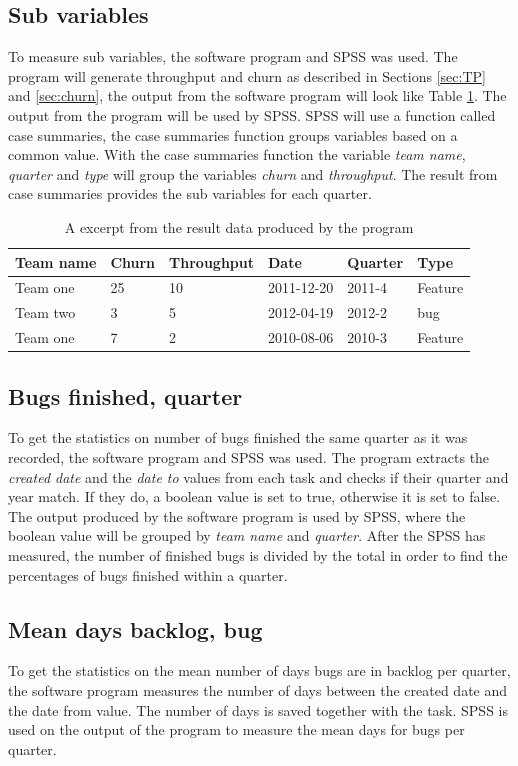 \documentclass[UKenglish]{ifimaster}  %
\begin{document}
\subsection {Sub variables}
\label{sec:bug}
To measure sub variables, the software program and SPSS was used. The program will generate throughput and churn as described in Sections \ref{sec:TP} and \ref{sec:churn}, the output from the software program will look like Table \ref{tab:ftb}. The output from the program will be used by SPSS. SPSS will use a function called case summaries, the case summaries function groups variables based on a common value.  With the case summaries function the variable \textit{team name}, \textit{quarter} and \textit{type} will group the variables \textit{churn} and \textit{throughput}. The result from case summaries provides the sub variables for each quarter.
\begin{table}[!ht]
\center
\caption{A excerpt from the result data produced by the program }
\begin{tabular}{ | l | l | l | l | l |l | }
\hline
	\bf{Team name} & \bf{Churn} &\bf{Throughput} & \bf{Date} & \bf{Quarte}r & \bf{Type} \\ \hline
	Team one & 25 &10&2011-12-20& 2011-4 & Feature \\ \hline
	Team two & 3 &5&2012-04-19 & 2012-2 & bug \\ \hline
	Team one & 7 &2& 2010-08-06 & 2010-3 & Feature \\ \hline
\end{tabular}
\label{tab:ftb} 
\end{table}

\subsection{Bugs finished, quarter}
\label{sub:sec:bfq} 
To get the statistics on number of bugs finished the same quarter as it was recorded, the software program and SPSS was used. The program extracts the \textit{created date} and the \textit{date to} values from each task and checks if their quarter and year match. If they do, a boolean value is set to true, otherwise it is set to false. The output produced by the software program is used by SPSS, where the boolean value will be grouped by \textit{team name} and \textit{quarter}. After the SPSS has measured, the number of finished bugs is divided by the total in order to find the percentages of bugs finished within a quarter. 
\subsection{Mean days backlog, bug}
\label{sub:sec:adbb}
To get the statistics on the mean number of days bugs are in backlog per quarter, the software program measures the number of days between the created date and the date from value. The number of days is saved together with the task. SPSS is used on the output of the program to measure the mean days for bugs per quarter.
\end{document}
